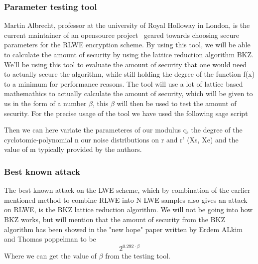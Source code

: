\documentclass[../main.tex]{subfiles}
\begin{document}
    \subsubsection{Parameter testing tool}
        Martin Albrecht, professor at the university of Royal Holloway in London, is the current maintainer of an
		opensource project~\cite{estimations-tool} geared towards choosing secure parameters for the RLWE encryption scheme.
		By using this tool, we will be able to calculate the amount of security by using the lattice reduction algorithm BKZ.
		We'll be using this tool to evaluate the amount of security that one would need to actually secure the algorithm,
		while still holding the degree of the function f(x) to a minimum for performance reasons.
		The tool will use a lot of lattice based mathemathics to actually calculate the amount of security, which will be given
		to us in the form of a number $\beta$, this $\beta$ will then be used to test the amount of security.
        For the precise usage of the tool we have used the following sage script
        
        Then we can here variate the parameteres of our modulus q, the degree of the cyclotomic-polynomial n
        our noise distributions on r and r' (Xs, Xe) and the value of m typically provided by the authors.

    \subsubsection{Best known attack}
		The best known attack on the LWE scheme, which by combination of the earlier mentioned method to combine RLWE
		into N LWE samples also gives an attack on RLWE, is the BKZ lattice reduction algorithm.
		We will not be going into how BKZ works, but will mention that the amount of security from the BKZ algorithm
		has been showed in the "new hope" paper \cite{usenix16} written by Erdem ALkim and Thomas poppelman to be
		\[ 2^{0.292 \cdot \beta} \]
		Where we can get the value of $\beta$ from the testing tool.
\end{document}
